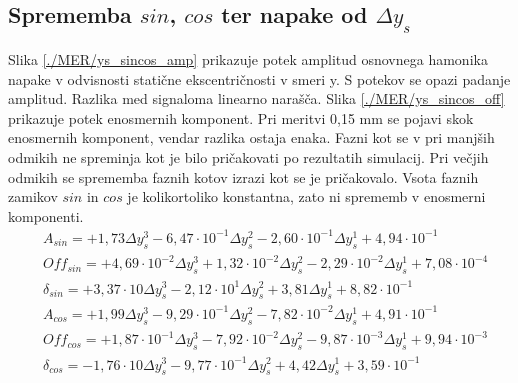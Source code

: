 \subsection{Sprememba $sin$, $cos$ ter napake od $\Delta y_s$}
Slika \ref{./MER/ys_sincos_amp} prikazuje potek amplitud osnovnega hamonika napake v odvisnosti statične ekscentričnosti v smeri y. S potekov se opazi padanje amplitud. Razlika med signaloma linearno narašča. 
Slika \ref{./MER/ys_sincos_off} prikazuje potek enosmernih komponent. Pri meritvi 0,15 mm se pojavi skok enosmernih komponent, vendar razlika ostaja enaka.
Fazni kot se v pri manjših odmikih ne spreminja kot je bilo pričakovati po rezultatih simulacij. Pri večjih odmikih se sprememba faznih kotov izrazi kot se je pričakovalo. Vsota faznih zamikov $sin$ in $cos$ je kolikortoliko konstantna, zato ni sprememb v enosmerni komponenti.
\begin{eqnarray}
&A_{sin} = +1,73            \Delta y_s^3-6,47\cdot 10^{-1}\Delta y_s^2-2,60\cdot 10^{-1}\Delta y_s^1+4,94\cdot 10^{-1}            \\    
&Off_{sin} = +4,69\cdot 10^{-2}\Delta y_s^3+1,32\cdot 10^{-2}\Delta y_s^2-2,29\cdot 10^{-2}\Delta y_s^1+7,08\cdot 10^{-4}            \\ 
&\delta_{sin} = +3,37\cdot 10    \Delta y_s^3-2,12\cdot 10^{1}\Delta y_s^2+3,81            \Delta y_s^1+8,82\cdot 10^{-1}            \\ 
&A_{cos} = +1,99            \Delta y_s^3-9,29\cdot 10^{-1}\Delta y_s^2-7,82\cdot 10^{-2}\Delta y_s^1+4,91\cdot 10^{-1}            \\    
&Off_{cos} = +1,87\cdot 10^{-1}\Delta y_s^3-7,92\cdot 10^{-2}\Delta y_s^2-9,87\cdot 10^{-3}\Delta y_s^1+9,94\cdot 10^{-3}            \\ 
&\delta_{cos} = -1,76\cdot 10    \Delta y_s^3-9,77\cdot 10^{-1}\Delta y_s^2+4,42            \Delta y_s^1+3,59\cdot 10^{-1}
\end{eqnarray}

